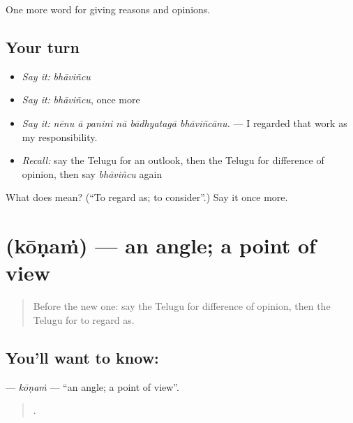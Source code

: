 \begin{grammarlens}[title={What you've built}]
One more word for giving reasons and opinions.
\end{grammarlens}

\subsection*{Your turn}
\begin{itemize}
\raggedright
  \item \emph{Say it:} \emph{bhāviñcu}
  \item \emph{Say it:} \emph{bhāviñcu}, once more
  \item \emph{Say it:} \emph{nēnu ā panini nā bādhyatagā bhāviñcānu.} — I regarded that work as my responsibility.
  \item \emph{Recall:} say the Telugu for an outlook, then the Telugu for difference of opinion, then say \emph{bhāviñcu} again
\end{itemize}

\begin{tcolorbox}[breakable,colback=teal!4,colframe=teal!35!black,title={Before you move on}]
What does  mean? (\textquotedblleft{}To regard as; to consider\textquotedblright{}.) Say it once more.
\end{tcolorbox}
\section[\texorpdfstring{\te{కోణం} (kōṇaṁ)}{కోణం (kōṇaṁ)}]{ (kōṇaṁ) — an angle; a point of view}

\label{lesson:TE-C382-konam}



\begin{quote}
Before the new one: say the Telugu for difference of opinion, then the Telugu for to regard as.
\end{quote}

\subsection*{You'll want to know: }
\textbf{} — \emph{kōṇaṁ} — \textquotedblleft{}an angle; a point of view\textquotedblright{}.

\begin{quote}
      .
\end{quote}

